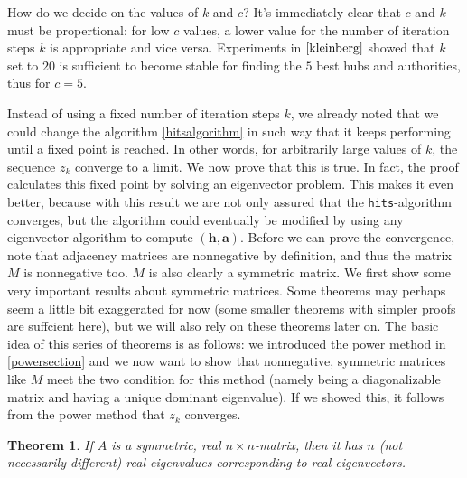 \documentclass[a4paper,11pt]{report}
\newtheorem{theorem}{Theorem}[section]
\begin{document}
How do we decide on the values of $k$ and $c$? It's immediately clear that $c$ and $k$ must
be propertional: for low $c$ values, a lower 
value for the number of iteration steps $k$ is appropriate and vice versa. 
Experiments in $\cite{kleinberg}$ showed that $k$ set to $20$ is sufficient to 
become stable for finding the $5$ best hubs and authorities, thus for $c = 5$. 

Instead of using a fixed number of iteration steps $k$, we already noted that we could change the algorithm \ref{hitsalgorithm} 
in such way that it keeps performing until a fixed point is reached. In other words, for arbitrarily large values of $k$, the
sequence $z_k$ converge to a limit.  We now 
prove that this is true. In fact, the proof calculates this fixed point by solving an
eigenvector problem. This makes it even better, because with this result we are not only assured that the \texttt{hits}-algorithm converges,
but the algorithm could eventually be modified
 by using any eigenvector algorithm to compute $(\mathbf{h},\mathbf{a})$. Before 
 we can prove the convergence, note that  adjacency matrices are nonnegative by definition, and thus the matrix $M$ is 
nonnegative too. $M$ is also clearly a symmetric matrix. We first show some very 
important results about symmetric matrices. Some theorems may perhaps seem a 
little bit exaggerated for now (some smaller theorems with simpler proofs are suffcient here), but we will also rely on these theorems later 
on. The basic idea of this series of theorems is as follows: we introduced the 
power method in \ref{powersection} and we now want to show that nonnegative, symmetric matrices like $M$ meet the two condition for 
this method (namely being a diagonalizable matrix and having a unique dominant 
eigenvalue). If we showed this, it follows from the power method that $z_k$ 
converges.
\begin{theorem}
  If $A$ is a symmetric, real $n\times n$-matrix, then it has $n$ (not necessarily different) real eigenvalues corresponding
  to real eigenvectors.
  \end{theorem}
\end{document}
